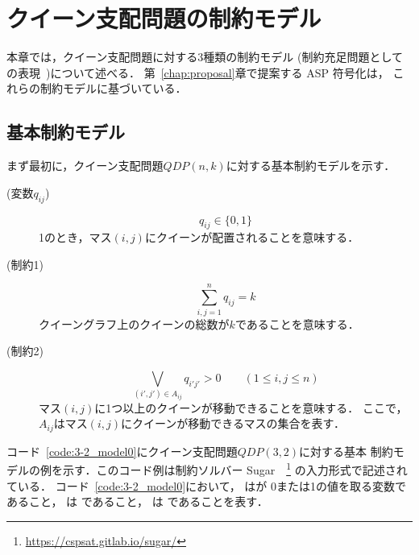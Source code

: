 \chapter{クイーン支配問題の制約モデル}\label{chap:constraint}
本章では，クイーン支配問題に対する3種類の制約モデル
(制約充足問題としての表現~\cite{yamamoto21})について述べる．
第~\ref{chap:proposal}章で提案する ASP 符号化は，
これらの制約モデルに基づいている．

\section{基本制約モデル}



まず最初に，クイーン支配問題$QDP(n,k)$に対する基本制約モデルを示す．

\begin{description}
\item[(変数$q_{ij}$)]
  \[q_{ij} \in \{0,1\}\]
  1のとき，マス$(i,j)$にクイーンが配置されることを意味する．
\item[(制約1)]
  \[\sum\limits_{i,j=1}^{n} q_{ij} = k\]
  クイーングラフ上のクイーンの総数が$k$であることを意味する．
\item[(制約2)]
  \[\bigvee\limits_{(i',j')\in A_{ij}} q_{i'j'} >0 \qquad (1 \leq i,j \leq n)\]
  マス$(i,j)$に1つ以上のクイーンが移動できることを意味する．
  ここで，$A_{ij}$はマス$(i,j)$にクイーンが移動できるマスの集合を表す．
\end{description}

コード~\ref{code:3-2_model0}にクイーン支配問題$QDP(3,2)$に対する基本
制約モデルの例を示す．このコード例は制約ソルバー
\textsf{Sugar}~\cite{%
CSC06:TamuraB08,
DBLP:journals/constraints/TamuraTKB09,
CSC08:TamuraTB08}~\footnote{%
\url{https://cspsat.gitlab.io/sugar/}}
の入力形式で記述されている．
コード~\ref{code:3-2_model0}において，
    はが
0または1の値を取る変数であること，  
は  
であること，  
は  
であることを表す．

